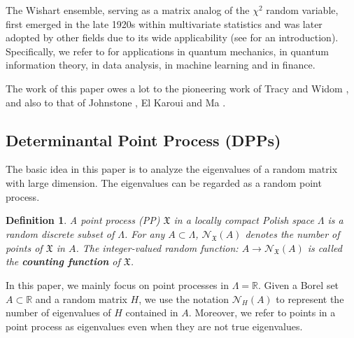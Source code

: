 \documentclass[11pt]{article}
\newtheorem{definition}[theorem]{Definition}
\numberwithin{equation}{section}%
\numberwithin{theorem}{section}
\begin{document}
The Wishart ensemble, serving as a matrix analog of the $\chi^2$ random variable, first emerged in the late 1920s within multivariate statistics and was later adopted by other fields due to its wide applicability (see \cite{muri-multi-1982} for an introduction). Specifically, we refer to \cite{guhr_random-matrix_1998} for applications in quantum mechanics, \cite{aubrun_alice_2017} in quantum information theory, \cite{vershynin_high-dimensional_2018} in data analysis, \cite{couillet_random_2023} in machine learning and \cite{plerou_random_2002} in finance.

The work of this paper owes a lot to the pioneering work of Tracy and Widom \cite{tracy1994level}, \cite{tracy1996orthogonal} and also to that of Johnstone \cite{johnstone2001distribution}, El Karoui \cite{el2006rate} and Ma \cite{ma_accuracy_2012}.


\subsection{Determinantal Point Process (DPPs)}
The basic idea in this paper is to analyze the eigenvalues of a random matrix with large dimension. The eigenvalues can be regarded as a random point process.
\begin{definition}\label{DPP}
 A point process (PP) $\mathfrak{X}$ in a locally compact Polish space $\Lambda$ is a random discrete subset of $\Lambda$. For any $A\subset\Lambda$,  $\mathcal{N}_\mathfrak{X}(A)$ denotes the number of points of $\mathfrak{X}$ in $A$. The integer-valued random function: $A\rightarrow\mathcal{N}_\mathfrak{X}(A)$
is called the \textbf{counting function} of $\mathfrak{X}$.   
\end{definition}
 In this paper, we mainly focus on point processes in $\Lambda=\mathbb{R}$. Given a Borel set $A\subset\mathbb{R}$ and a random matrix $H$, we use the notation $\mathcal{N}_H(A)$ to represent the number of eigenvalues of $H$ contained in $A$. Moreover, we refer to points in a point process as eigenvalues even when they are not true eigenvalues.
\end{document}
